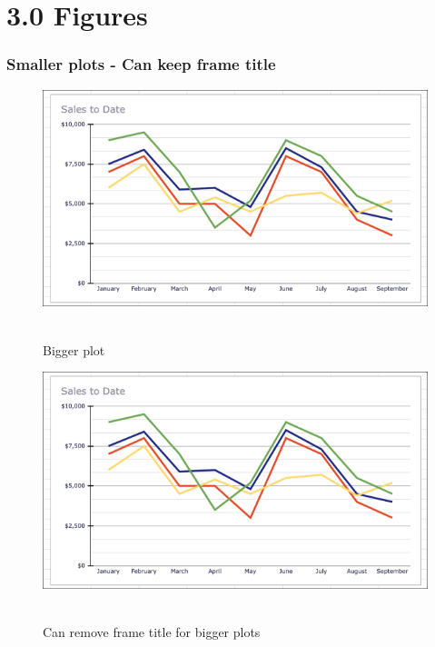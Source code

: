 \documentclass[t,compress,9pt,aspectratio=169]{beamer}
\begin{document}
\section{3.0 Figures}
\begin{frame}[fragile]
  \frametitle{Smaller plots - Can keep frame title}
    \begin{figure}[!htbp]
      \centering
      \vspace*{-.5cm}\caption{Bigger plot}
      \includegraphics[scale=.5]{figures/line_plot.png}\
    \end{figure}
\end{frame}



\begin{frame}[fragile]
  \noframetitle[0mm]
    \begin{figure}[!htbp]
      \centering
      \vspace*{-1.5cm}\caption{Can remove frame title for bigger plots}
      \includegraphics[scale=.7]{figures/line_plot.png}\
    \end{figure}
\end{frame}
\end{document}
